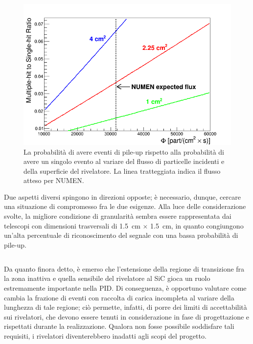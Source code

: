 \begin{figure} [!t]
	\centering
	\includegraphics[scale=0.55]{Grafici_Tesi/Granularita/pile-up_label2.png}
	\caption{La probabilità di avere eventi di pile-up rispetto alla probabilità di avere un singolo evento al variare del flusso di particelle incidenti e della superficie del rivelatore. La linea tratteggiata indica il flusso atteso per NUMEN.} \label{fig:pile-up}
\end{figure}


Due aspetti diversi spingono in direzioni opposte; è necessario, dunque, cercare una situazione di compromesso fra le due esigenze.
Alla luce delle considerazione svolte, la migliore condizione di granularità sembra essere rappresentata dai telescopi con dimensioni trasversali di 1.5~cm $\times$ 1.5~cm, in quanto congiungono un'alta percentuale di riconoscimento del segnale con una bassa probabilità di pile-up.





\subsection{}

Da quanto finora detto, è emerso che l'estensione della regione di transizione fra la zona inattiva e quella sensibile del rivelatore al SiC gioca un ruolo estremamente importante nella PID.
Di conseguenza, è opportuno valutare come cambia la frazione di eventi con raccolta di carica incompleta al variare della lunghezza di tale regione; 
ciò permette, infatti, di porre dei limiti di accettabilità sui rivelatori, che devono essere tenuti in considerazione in fase di progettazione e rispettati durante la realizzazione.
Qualora non fosse possibile soddisfare tali requisiti, i rivelatori diventerebbero inadatti agli scopi del progetto.


